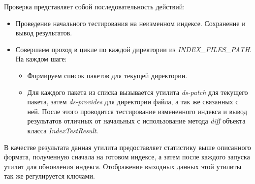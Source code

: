 Проверка представляет собой последовательность действий:\\
\begin{itemize}
\item{Проведение начального тестирования на неизменном индексе. Сохранение
и вывод результатов.}
\item{Совершаем проход в цикле по каждой директории из \emph{INDEX\_FILES\_PATH}. На
каждом шаге:
	\begin{itemize}
	\item{Формируем список пакетов для текущей директории.}
	\item{Для каждого пакета из списка вызывается утилита \textit{ds-patch }
	для текущего пакета, затем \textit{ds-provides} для директории файла, а 
	так же связанных с ней. После этого проводится тестирование
	измененного индекса и вывод результатов отличных от начальных
	с использование метода \textit{diff} объекта класса \textit{IndexTestResult}.}
	\end{itemize}
}
\end{itemize}

В качестве результата данная утилита предоставляет статистику выше описанного формата,
полученную сначала на готовом индексе, а затем после каждого запуска утилит для обновления
индекса. Отображение выходных данных этой утилиты так же регулируется ключами.








